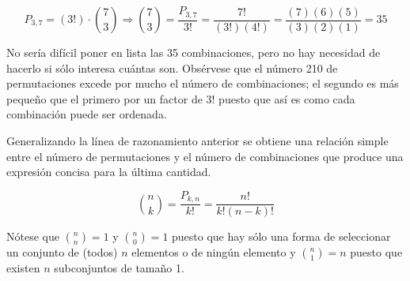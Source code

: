 \documentclass[
  11pt,
]{book}
\theoremstyle{definition}
\theoremstyle{definition}
\theoremstyle{definition}
\theoremstyle{definition}
\theoremstyle{remark}
\begin{document}
\[
P_{3,7} = (3!) \cdot \binom{7}{3} \Rightarrow \binom{7}{3} = \frac{P_{3,7}}{3!} = \frac{7!}{(3!)(4!)} = \frac{(7)(6)(5)}{(3)(2)(1)} = 35
\]

No sería difícil poner en lista las 35 combinaciones, pero no hay necesidad de hacerlo si sólo interesa cuántas son. Obsérvese que el número 210 de permutaciones excede por mucho el número de combinaciones; el segundo es más pequeño que el primero por un factor de 3! puesto que así es como cada combinación puede ser ordenada.

Generalizando la línea de razonamiento anterior se obtiene una relación simple entre el número de permutaciones y el número de combinaciones que produce una expresión concisa para la última cantidad.

\begin{equation}
\binom{n}{k} = \frac{P_{k,n}}{k!} = \frac{n!}{k!(n-k)!}
\label{eq:combinaciones}
\end{equation}

Nótese que \(\binom{n}{n} = 1\) y \(\binom{n}{0} = 1\) puesto que hay sólo una forma de seleccionar un conjunto de (todos) \(n\) elementos o de ningún elemento y \(\binom{n}{1} = n\) puesto que existen \(n\) subconjuntos de tamaño 1.
\end{document}

